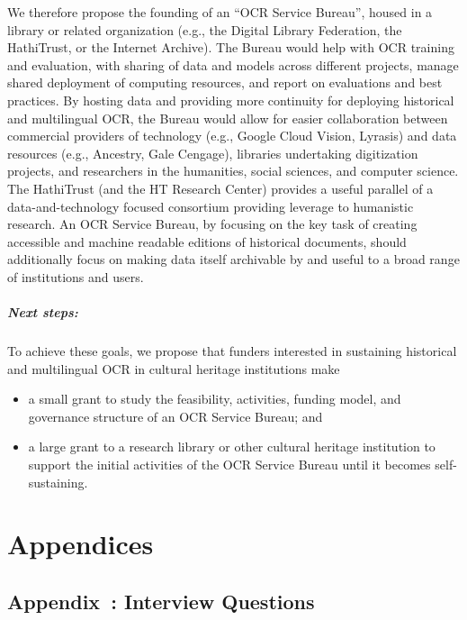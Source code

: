 \documentclass[twoside,11pt]{report}
\newcounter{appcounter}
\renewcommand{\theappcounter}{\Alph{appcounter}}
\renewcommand{\appendix}[2]{\refstepcounter{appcounter}%
  \label{app:#1}%
  \section{Appendix~\theappcounter: #2}%
  \label{sec:app-#1}}
\begin{document}
We therefore propose the founding of an ``OCR Service Bureau'', housed in a library or related organization (e.g., the Digital Library Federation, the HathiTrust, or the Internet Archive). The Bureau would help with OCR training and evaluation, with sharing of data and models across different projects, manage shared deployment of computing resources, and report on evaluations and best practices. By hosting data and providing more continuity for deploying historical and multilingual OCR, the Bureau would allow for easier collaboration between commercial providers of technology (e.g., Google Cloud Vision, Lyrasis) and data resources (e.g., Ancestry, Gale Cengage), libraries undertaking digitization projects, and researchers in the humanities, social sciences, and computer science. The HathiTrust (and the HT Research Center) provides a useful parallel of a data-and-technology focused consortium providing leverage to humanistic research. An OCR Service Bureau, by focusing on the key task of creating accessible and machine readable editions of historical documents, should additionally focus on making data itself archivable by and useful to a broad range of institutions and users.

\paragraph{Next steps:} To achieve these goals, we propose that funders interested in sustaining historical and multilingual OCR in cultural heritage institutions make
\begin{itemize}

\item a small grant to study the feasibility, activities, funding model, and governance structure of an OCR Service Bureau; and

\item a large grant to a research library or other cultural heritage institution to support the initial activities of the OCR Service Bureau until it becomes self-sustaining.

\end{itemize}




\chapter{Appendices}

\appendix{questions}{Interview Questions}
\end{document}
